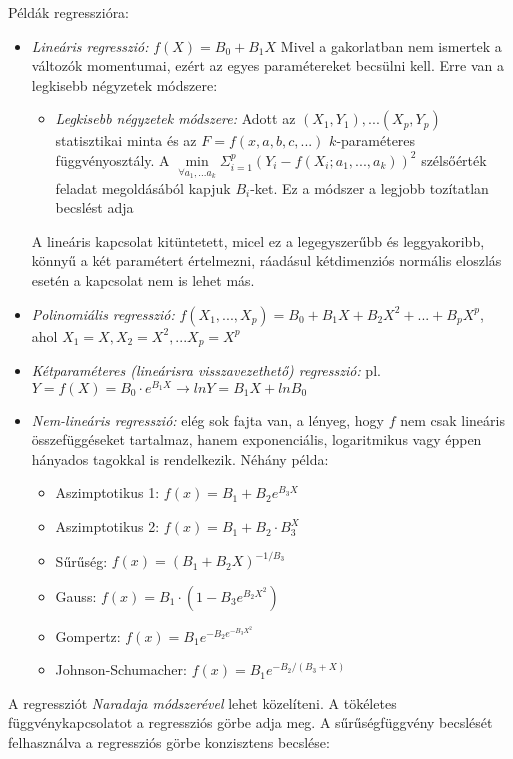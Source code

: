 Példák regresszióra:
\begin{itemize}

\item \emph{Lineáris regresszió:} $f(X) = B_0 + B_1X$ Mivel a gakorlatban nem ismertek a változók momentumai, ezért az egyes paramétereket becsülni kell. Erre van a legkisebb négyzetek módszere:
\begin{itemize}
\item \emph{Legkisebb négyzetek módszere:} Adott az $(X_1,Y_1), ... (X_p,Y_p)$ statisztikai minta és az $F = {f(x,a,b,c,...)}$ $k$-paraméteres függvényosztály. A $\min\limits_{\forall a_1, ... a_k} \Sigma_{i=1}^p(Y_i - f(X_i; a_1, ..., a_k))^2$ szélsőérték feladat megoldásából kapjuk $B_i$-ket. Ez a módszer a legjobb tozítatlan becslést adja
\end{itemize}

A lineáris kapcsolat kitüntetett, micel ez a legegyszerűbb és leggyakoribb, könnyű a két paramétert értelmezni, ráadásul kétdimenziós normális eloszlás esetén a kapcsolat nem is lehet más.

\item \emph{Polinomiális regresszió:} $f(X_1, ..., X_p) = B_0 + B_1X+B_2X^2+ ...+ B_pX^p$, ahol $X_1 = X, X_2 = X^2, ... X_p = X^p$

\item \emph{Kétparaméteres (lineárisra visszavezethető) regresszió:} pl. $Y=f(X)=B_0\cdot e^{B_1X} \rightarrow lnY = B_1X + lnB_0$

\item \emph{Nem-lineáris regresszió:} elég sok fajta van, a lényeg, hogy $f$ nem csak lineáris összefüggéseket tartalmaz, hanem exponenciális, logaritmikus vagy éppen hányados tagokkal is rendelkezik. Néhány példa:
	\begin{itemize}
	\item Aszimptotikus 1: $f(x) = B_1 + B_2 e^{B_3X}$
	\item Aszimptotikus 2: $f(x) = B_1 + B_2 \cdot B_3^X$
	\item Sűrűség: $f(x) = (B_1 + B_2 X)^{-1/B_3}$
	\item Gauss: $f(x) = B_1 \cdot (1- B_3 e^{B_2X^2})$
	\item Gompertz: $f(x) = B_1 e^{ -B_2 e^{-B_3X^2}}$
	\item Johnson-Schumacher: $f(x) = B_1 e^{ -B_2 /(B_3 + X)}$
	\end{itemize}
\end{itemize}

A regressziót \emph{Naradaja módszerével} lehet közelíteni. A tökéletes függvénykapcsolatot a regressziós görbe adja meg. A sűrűségfüggvény becslését felhasználva a regressziós görbe konzisztens becslése:

